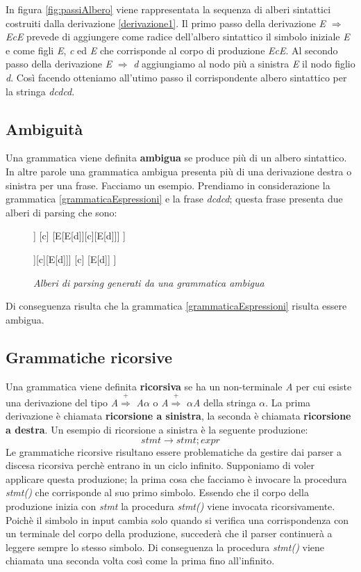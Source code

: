 \noindent In figura \ref{fig:passiAlbero} viene rappresentata la sequenza di alberi sintattici costruiti dalla derivazione \ref{derivazione1}. Il primo passo della derivazione \textit{E} $\Rightarrow$ \textit{EcE} prevede di aggiungere come radice dell'albero sintattico il simbolo iniziale \textit{E} e come figli \textit{E}, \textit{c} ed \textit{E} che corrisponde al corpo di produzione \textit{EcE}. Al secondo passo della derivazione \textit{E} $\Rightarrow$ \textit{d} aggiungiamo al nodo più a sinistra \textit{E} il nodo figlio \textit{d}. Così facendo otteniamo all'utimo passo il corrispondente albero sintattico per la stringa \textit{dcdcd}.
\subsection{Ambiguità}
Una grammatica viene definita \textbf{ambigua} se produce più di un albero sintattico. In altre parole una grammatica ambigua presenta \cite{libro: compilatori} più di una derivazione destra o sinistra per una frase. Facciamo un esempio. Prendiamo in considerazione la grammatica \ref{grammaticaEspressioni} e la frase \textit{dcdcd}; questa frase presenta due alberi di parsing che sono:\par
\begin{figure}[hbpb]\label{alberibis}
	\centering
	\begin{forest}
	[E
	[E[d]]
	[c]
	[E[E[d]][c][E[d]]]
	]
	\end{forest}
	\begin{forest}
	[E
	[E[E[d]][c][E[d]]]
	[c]
	[E[d]]
	]
	\end{forest}
	\caption{\textit{Alberi di parsing generati da una grammatica ambigua}}
\end{figure}
\noindent Di conseguenza risulta che la grammatica \ref{grammaticaEspressioni} risulta essere ambigua.
\subsection{Grammatiche ricorsive}\label{par:ric}
Una grammatica viene definita \textbf{ricorsiva} \cite{libro: compilatori} se ha un non-terminale \textit{A} per cui esiste una derivazione del tipo \textit{A}$\overset{+}{\Rightarrow}$ \textit{A}$\alpha$ o \textit{A}$\overset{+}{\Rightarrow}$ $\alpha$\textit{A} della stringa $\alpha$. La prima derivazione è chiamata \textbf{ricorsione a sinistra}, la seconda è chiamata \textbf{ricorsione a destra}. Un esempio di ricorsione a sinistra è la seguente produzione:
\[
	stmt \to stmt; expr
\]
Le grammatiche ricorsive risultano essere problematiche da gestire dai parser a discesa ricorsiva perchè entrano in un ciclo infinito. Supponiamo di voler applicare questa produzione; la prima cosa che facciamo è invocare la procedura \textit{stmt()} che corrisponde al suo primo simbolo. Essendo che il corpo della produzione inizia con \textit{stmt} la procedura \textit{stmt()} viene invocata ricorsivamente. Poichè il simbolo in input cambia solo quando si verifica una corrispondenza con un terminale del corpo della produzione, succederà che il parser continuerà a leggere sempre lo stesso simbolo. Di conseguenza la procedura \textit{stmt()} viene chiamata una seconda volta così come la prima fino all'infinito.
